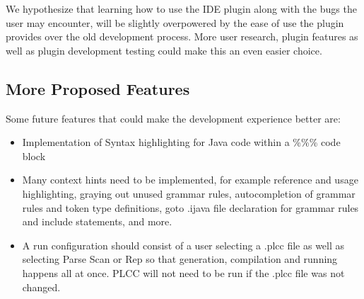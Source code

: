\documentclass[conference, letterpaper]{IEEEtran}
\begin{document}
We hypothesize that learning how to use the IDE plugin along with the bugs the user may encounter, will be slightly overpowered by the ease of use the plugin provides over the old development process.
More user research, plugin features as well as plugin development testing could make this an even easier choice.

\subsection{More Proposed Features}\label{subsec:more-proposed-features}

Some future features that could make the development experience better are:
\begin{itemize}
    \item Implementation of Syntax highlighting for Java code within a \%\%\% code block
    \item Many context hints need to be implemented, for example reference and usage highlighting, graying out unused grammar rules, autocompletion of grammar rules and token type definitions, goto .ijava file declaration for grammar rules and include statements, and more.
    \item A run configuration should consist of a user selecting a .plcc file as well as selecting Parse Scan or Rep so that generation, compilation and running happens all at once.
    PLCC will not need to be run if the .plcc file was not changed.
\end{itemize}

%
%

%
\end{document}

